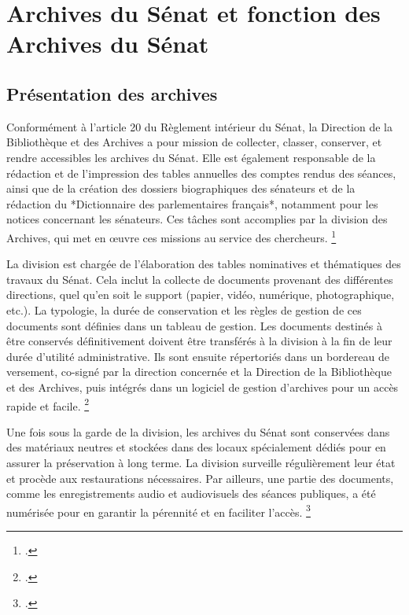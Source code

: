 \section{Archives du Sénat et fonction des Archives du Sénat}

\subsection{Présentation des archives}

Conformément à l'article 20 du Règlement intérieur du Sénat, la Direction de la Bibliothèque et des Archives a pour mission de collecter, classer, conserver, et rendre accessibles les archives du Sénat. Elle est également responsable de la rédaction et de l'impression des tables annuelles des comptes rendus des séances, ainsi que de la création des dossiers biographiques des sénateurs et de la rédaction du *Dictionnaire des parlementaires français*, notamment pour les notices concernant les sénateurs. Ces tâches sont accomplies par la division des Archives, qui met en œuvre ces missions au service des chercheurs. \footcite{GuideduLecteur}

La division est chargée de l'élaboration des tables nominatives et thématiques des travaux du Sénat. Cela inclut la collecte de documents provenant des différentes directions, quel qu'en soit le support (papier, vidéo, numérique, photographique, etc.). La typologie, la durée de conservation et les règles de gestion de ces documents sont définies dans un tableau de gestion. Les documents destinés à être conservés définitivement doivent être transférés à la division à la fin de leur durée d'utilité administrative. Ils sont ensuite répertoriés dans un bordereau de versement, co-signé par la direction concernée et la Direction de la Bibliothèque et des Archives, puis intégrés dans un logiciel de gestion d'archives pour un accès rapide et facile. \footcite{GuideduLecteur}

Une fois sous la garde de la division, les archives du Sénat sont conservées dans des matériaux neutres et stockées dans des locaux spécialement dédiés pour en assurer la préservation à long terme. La division surveille régulièrement leur état et procède aux restaurations nécessaires. Par ailleurs, une partie des documents, comme les enregistrements audio et audiovisuels des séances publiques, a été numérisée pour en garantir la pérennité et en faciliter l'accès. \footcite{GuideduLecteur}

